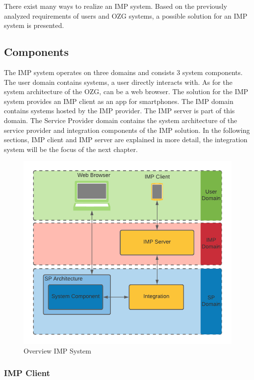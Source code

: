 There exist many ways to realize an IMP system. Based on the previously analyzed requirements of users and OZG systems, a possible solution for an IMP system is presented.

\subsection{Components}
The IMP system operates on three domains and consists 3 system components. The user domain contains systems, a user directly interacts with. As for the system architecture of the OZG, can be a web browser. The solution for the IMP system provides an IMP client as an app for smartphones. The IMP domain contains systems hosted by the IMP provider. The IMP server is part of this domain. The Service Provider domain contains the system architecture of the service provider and integration components of the IMP solution.
In the following sections, IMP client and IMP server are explained in more detail, the integration system will be the focus of the next chapter.

\begin{figure}[h]
\caption{Overview IMP System}
    \centering
    \includegraphics[scale=0.25]{Diagrams/IMP System Overview.png}
\end{figure}

\subsubsection{IMP Client}

